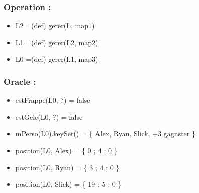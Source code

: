 \documentclass[11pt]{article}
\begin{document}
\subsubsection{Operation :}
\label{sec-1.9.2}

\begin{itemize}

\item L2 =(def) gerer(L, map1)\\
\label{sec-1.9.2.1}


\item L1 =(def) gerer(L2, map2)\\
\label{sec-1.9.2.2}


\item L0 =(def) gerer(L1, map3)\\
\label{sec-1.9.2.3}

\end{itemize} %
\subsubsection{Oracle :}
\label{sec-1.9.3}

\begin{itemize}

\item estFrappe(L0, ?) = false\\
\label{sec-1.9.3.1}


\item estGele(L0, ?) = false\\
\label{sec-1.9.3.2}


\item mPerso(L0).keySet() = \{ Alex, Ryan, Slick, +3 gagnster \}\\
\label{sec-1.9.3.3}


\item position(L0, Alex) = \{ 0 ; 4 ; 0 \}\\
\label{sec-1.9.3.4}


\item position(L0, Ryan) = \{ 3 ; 4 ; 0 \}\\
\label{sec-1.9.3.5}


\item position(L0, Slick) = \{ 19 ; 5 ; 0 \}\\
\label{sec-1.9.3.6}

\end{itemize} %
\end{document}
